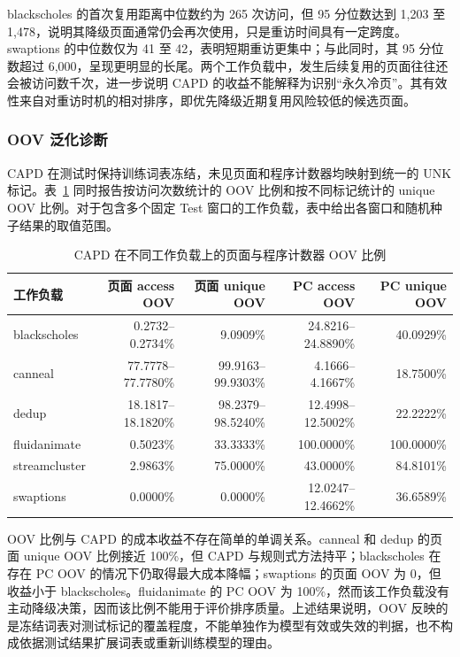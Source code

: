 blackscholes 的首次复用距离中位数约为 265 次访问，但 95 分位数达到 1,203 至 1,478，说明其降级页面通常仍会再次使用，只是重访时间具有一定跨度。swaptions 的中位数仅为 41 至 42，表明短期重访更集中；与此同时，其 95 分位数超过 6,000，呈现更明显的长尾。两个工作负载中，发生后续复用的页面往往还会被访问数千次，进一步说明 CAPD 的收益不能解释为识别“永久冷页”。其有效性来自对重访时机的相对排序，即优先降级近期复用风险较低的候选页面。

\subsubsection{\heiti OOV 泛化诊断}

CAPD 在测试时保持训练词表冻结，未见页面和程序计数器均映射到统一的 UNK 标记。表~\ref{tab:capd-oov} 同时报告按访问次数统计的 OOV 比例和按不同标记统计的 unique OOV 比例。对于包含多个固定 Test 窗口的工作负载，表中给出各窗口和随机种子结果的取值范围。

\begin{table}[htbp]
  \centering
  \scriptsize
  \caption{CAPD 在不同工作负载上的页面与程序计数器 OOV 比例}
  \label{tab:capd-oov}
  \renewcommand{\arraystretch}{1.12}
  \setlength{\tabcolsep}{5pt}
  \begin{tabular}{lrrrr}
    \toprule
    工作负载 & 页面 access OOV & 页面 unique OOV & PC access OOV & PC unique OOV \\
    \midrule
    blackscholes  & 0.2732--0.2734\%   & 9.0909\%          & 24.8216--24.8890\% & 40.0929\% \\
    canneal       & 77.7778--77.7780\% & 99.9163--99.9303\% & 4.1666--4.1667\%   & 18.7500\% \\
    dedup         & 18.1817--18.1820\% & 98.2379--98.5240\% & 12.4998--12.5002\% & 22.2222\% \\
    fluidanimate  & 0.5023\%           & 33.3333\%          & 100.0000\%          & 100.0000\% \\
    streamcluster & 2.9863\%           & 75.0000\%          & 43.0000\%           & 84.8101\% \\
    swaptions     & 0.0000\%           & 0.0000\%           & 12.0247--12.4662\% & 36.6589\% \\
    \bottomrule
  \end{tabular}
\end{table}

OOV 比例与 CAPD 的成本收益不存在简单的单调关系。canneal 和 dedup 的页面 unique OOV 比例接近 100\%，但 CAPD 与规则式方法持平；blackscholes 在存在 PC OOV 的情况下仍取得最大成本降幅；swaptions 的页面 OOV 为 0，但收益小于 blackscholes。fluidanimate 的 PC OOV 为 100\%，然而该工作负载没有主动降级决策，因而该比例不能用于评价排序质量。上述结果说明，OOV 反映的是冻结词表对测试标记的覆盖程度，不能单独作为模型有效或失效的判据，也不构成依据测试结果扩展词表或重新训练模型的理由。

